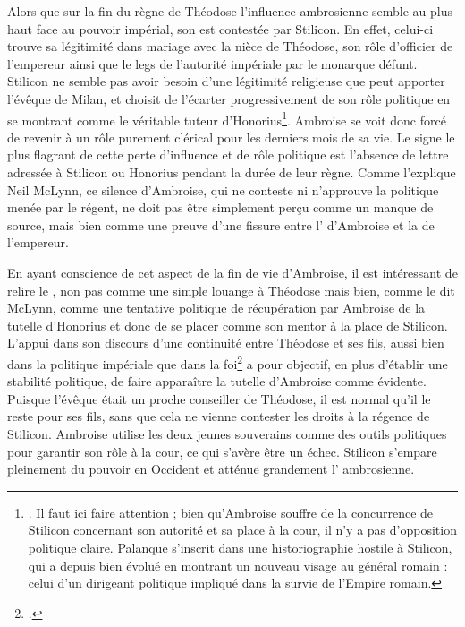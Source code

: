 Alors que sur la fin du règne de Théodose l'influence ambrosienne semble au plus haut face au pouvoir impérial, son  est contestée par Stilicon. En effet, celui-ci trouve sa légitimité dans mariage avec la nièce de Théodose, son rôle d'officier de l'empereur ainsi que le legs de l'autorité impériale par le monarque défunt. Stilicon ne semble pas avoir besoin d'une légitimité religieuse que peut apporter l'évêque de Milan, et choisit de l'écarter progressivement de son rôle politique en se montrant comme le véritable tuteur d'Honorius\footnote{\cite[à partir de la page 298]{palanque_ambroise}. Il faut ici faire attention ; bien qu'Ambroise souffre de la concurrence de Stilicon concernant son autorité et sa place à la cour, il n'y a pas d'opposition politique claire. Palanque s'inscrit dans une historiographie hostile à Stilicon, qui a depuis bien évolué en montrant un nouveau visage au général romain : celui d'un dirigeant politique impliqué dans la survie de l'Empire romain.}. Ambroise se voit donc forcé de revenir à un rôle purement clérical pour les derniers mois de sa vie. Le signe le plus flagrant de cette perte d'influence et de rôle politique est l'absence de lettre adressée à Stilicon ou Honorius pendant la durée de leur règne. Comme l'explique Neil McLynn, ce silence d'Ambroise, qui ne conteste ni n'approuve la politique menée par le régent, ne doit pas être simplement perçu comme un manque de source, mais bien comme une preuve d'une fissure entre l' d'Ambroise et la  de l'empereur\autocite[366]{mclynn_ambrose}.

\bigskip

En ayant conscience de cet aspect de la fin de vie d'Ambroise, il est intéressant de relire le , non pas comme une simple louange à Théodose mais bien, comme le dit McLynn, comme une tentative politique de récupération par Ambroise de la tutelle d'Honorius et donc de se placer comme son mentor à la place de Stilicon\autocite[358-360]{mclynn_ambrose}. L'appui dans son discours d'une continuité entre Théodose et ses fils, aussi bien dans la politique impériale que dans la foi\footnote{\cite[-7]{ambroise_mort_theodose}.} a pour objectif, en plus d'établir une stabilité politique, de faire apparaître la tutelle d'Ambroise comme évidente. Puisque l'évêque était un proche conseiller de Théodose, il est normal qu'il le reste pour ses fils, sans que cela ne vienne contester les droits à la régence de Stilicon. Ambroise utilise les deux jeunes souverains comme des outils politiques pour garantir son rôle à la cour, ce qui s'avère être un échec. Stilicon s'empare pleinement du pouvoir en Occident et atténue grandement l' ambrosienne.

